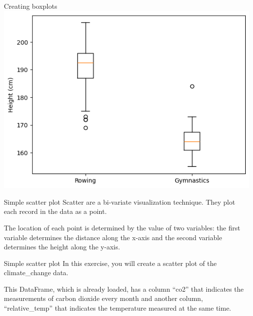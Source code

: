 \documentclass[
  ignorenonframetext,
]{beamer}
\begin{document}
\begin{frame}{Creating boxplots}
\label{creating-boxplots-4}
\includegraphics{../images/im246.png}
\end{frame}

\begin{frame}{Simple scatter plot}
\label{simple-scatter-plot}
Scatter are a bi-variate visualization technique. They plot each record
in the data as a point.

The location of each point is determined by the value of two variables:
the first variable determines the distance along the x-axis and the
second variable determines the height along the y-axis.
\end{frame}

\begin{frame}{Simple scatter plot}
\label{simple-scatter-plot-1}
In this exercise, you will create a scatter plot of the climate\_change
data.

This DataFrame, which is already loaded, has a column ``co2'' that
indicates the measurements of carbon dioxide every month and another
column, ``relative\_temp'' that indicates the temperature measured at
the same time.
\end{frame}
\end{document}
